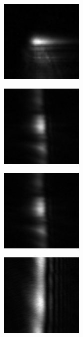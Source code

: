 \begin{figure}[ht]
\centering
\begin{subfigure}[b]{4cm}
\includegraphics[width=4cm,keepaspectratio]{interference/figures/move/321-1.png}
\caption{}
\end{subfigure}
\begin{subfigure}[b]{4cm}
\includegraphics[width=4cm,keepaspectratio]{interference/figures/move/321-2.png}
\caption{}
\end{subfigure}
\begin{subfigure}[b]{4cm}
\includegraphics[width=4cm,keepaspectratio]{interference/figures/move/321-3.png}
\caption{}
\end{subfigure}
\begin{subfigure}[b]{4cm}
\includegraphics[width=4cm,keepaspectratio]{interference/figures/move/321-7.png}
\caption{}
\end{subfigure}

\end{figure}
